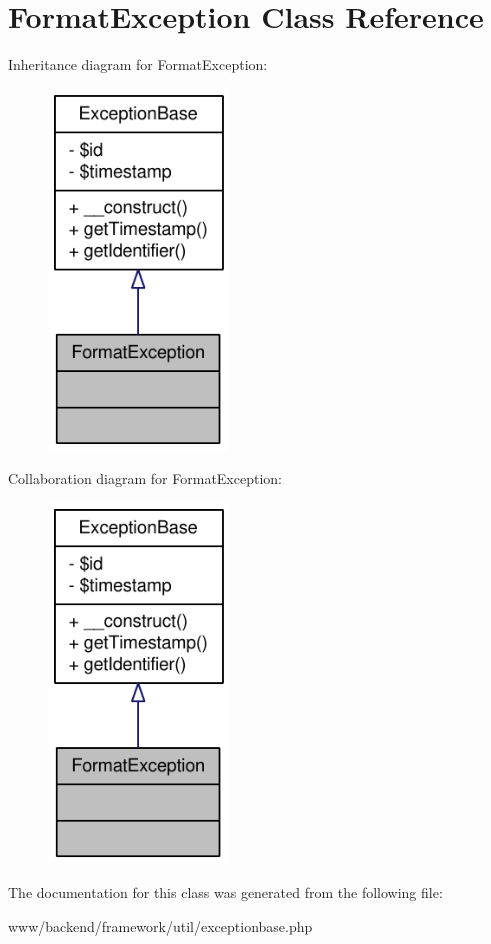 \hypertarget{classFormatException}{
\section{FormatException Class Reference}
\label{classFormatException}
}


Inheritance diagram for FormatException:\nopagebreak
\begin{figure}[H]
\begin{center}
\leavevmode
\includegraphics[width=136pt]{classFormatException__inherit__graph}
\end{center}
\end{figure}


Collaboration diagram for FormatException:\nopagebreak
\begin{figure}[H]
\begin{center}
\leavevmode
\includegraphics[width=136pt]{classFormatException__coll__graph}
\end{center}
\end{figure}


The documentation for this class was generated from the following file:\begin{DoxyCompactItemize}
\item 
www/backend/framework/util/exceptionbase.php\end{DoxyCompactItemize}
